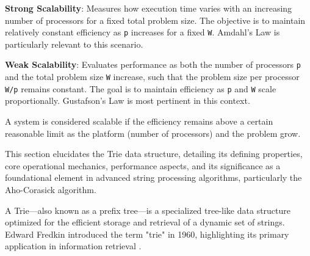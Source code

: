 \textbf{Strong Scalability}: Measures how execution time varies with an increasing number of processors for a fixed total problem size. The objective is to maintain relatively constant efficiency as \texttt{p} increases for a fixed \texttt{W}. Amdahl's Law is particularly relevant to this scenario.

\textbf{Weak Scalability}: Evaluates performance as both the number of processors \texttt{p} and the total problem size \texttt{W} increase, such that the problem size per processor \texttt{W/p} remains constant. The goal is to maintain efficiency as \texttt{p} and \texttt{W} scale proportionally. Gustafson's Law is most pertinent in this context.

A system is considered scalable if the efficiency remains above a certain reasonable limit as the platform (number of processors) and the problem grow.






This section elucidates the Trie data structure, detailing its defining properties, core operational mechanics, performance aspects, and its significance as a foundational element in advanced string processing algorithms, particularly the Aho-Corasick algorithm.


A Trie---also known as a prefix tree---is a specialized tree-like data structure optimized for the efficient storage and retrieval of a dynamic set of strings. Edward Fredkin introduced the term "trie" in 1960, highlighting its primary application in information retrieval \cite{Fredkin1960, Knuth1998}.

